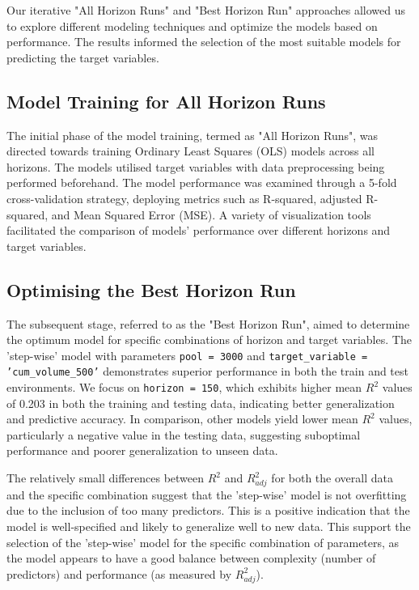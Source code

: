 \documentclass{article}
\begin{document}
Our iterative "All Horizon Runs" and "Best Horizon Run" approaches allowed us to explore different modeling techniques and optimize the models based on performance. The results informed the selection of the most suitable models for predicting the target variables.

\subsection{Model Training for All Horizon Runs}

The initial phase of the model training, termed as "All Horizon Runs", was directed towards training Ordinary Least Squares (OLS) models across all horizons. The models utilised target variables with data preprocessing being performed beforehand. The model performance was examined through a 5-fold cross-validation strategy, deploying metrics such as R-squared, adjusted R-squared, and Mean Squared Error (MSE). A variety of visualization tools facilitated the comparison of models' performance over different horizons and target variables.

\subsection{Optimising the Best Horizon Run}

The subsequent stage, referred to as the "Best Horizon Run", aimed to determine the optimum model for specific combinations of horizon and target variables. The 'step-wise' model with parameters \texttt{pool = 3000} and \texttt{target\_variable = 'cum\_volume\_500'} demonstrates superior performance in both the train and test environments. We focus on \texttt{horizon = 150}, which exhibits higher mean $R^2$ values of 0.203 in both the training and testing data, indicating better generalization and predictive accuracy. In comparison, other models yield lower mean $R^2$ values, particularly a negative value in the testing data, suggesting suboptimal performance and poorer generalization to unseen data.

The relatively small differences between \(R^2\) and \(R^2_{adj}\) for both the overall data and the specific combination suggest that the 'step-wise' model is not overfitting due to the inclusion of too many predictors. This is a positive indication that the model is well-specified and likely to generalize well to new data. This support the selection of the 'step-wise' model for the specific combination of parameters, as the model appears to have a good balance between complexity (number of predictors) and performance (as measured by \(R^2_{adj}\)).
\end{document}
